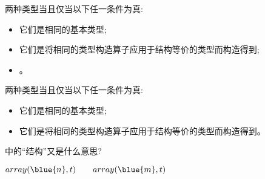 \begin{frame}{}
  \begin{center}
    \begin{definition}
      两种类型当且仅当以下任一条件为真:
      \begin{itemize}
        \item 它们是相同的基本类型;
        \item 它们是将相同的类型构造算子应用于结构等价的类型而构造得到;
        \item {}。
      \end{itemize}
    \end{definition}

    \pause
    \vspace{0.80cm}
    \begin{definition}
      两种类型当且仅当以下任一条件为真:
      \begin{itemize}
        \item 它们是相同的基本类型;
        \item 它们是将相同的类型构造算子应用于结构等价的类型而构造得到。
      \end{itemize}
    \end{definition}
  \end{center}
\end{frame}

\begin{frame}{}
  \begin{center}
    中的``结构''又是什么意思?

    \vspace{0.60cm}
    $array(\blue{n}, t)  \qquad array(\blue{m}, t)$

    \pause
    \vspace{0.80cm}
    \begin{columns}
    \end{columns}

    \pause
    \vspace{1.00cm}
  \end{center}
\end{frame}

